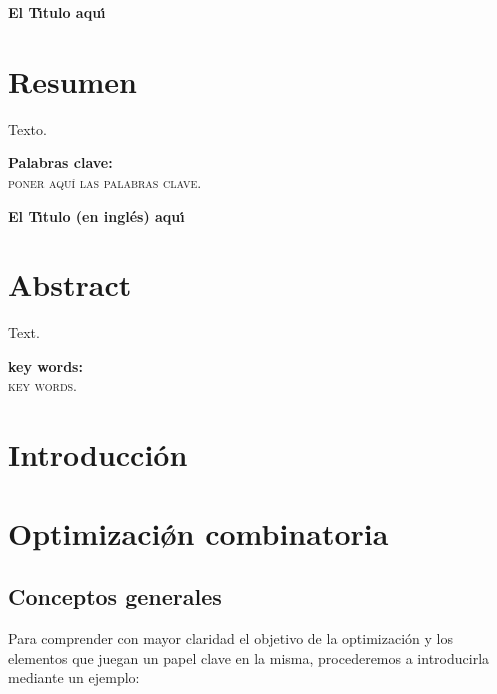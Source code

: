 \documentclass[a4paper, 12pt, oneside]{book}
\begin{document}
	
	
	
	
	
	
	
	
	
	
	\tableofcontents
	
	
	\pagebreak
	
	{\let\clearpage\relax
		
		{\Large \textbf{El T\'{\i}tulo aqu\'{\i}}}\\
		
		\chapter*{Resumen}
	}
	Texto.
	
	\vfill
	
	\textbf{Palabras clave:}\\
	
	\textsc{poner aqu\'{\i} las palabras clave.}
	
	\pagebreak
	
	{\let\clearpage\relax
		
		{\Large \textbf{El T\'{\i}tulo (en ingl\'{e}s) aqu\'{\i}}}\\
		
		\chapter*{Abstract}
	}
	
	Text. 
	
	\vfill
	
	\textbf{key words:}\\
	
	\textsc{key words.}
	
	\chapter*{Introducci\'on}
	
	
	\chapter{Optimizaci\'{\o}n combinatoria}
	\setcounter{page}{1}
	
	\section{Conceptos generales}
	Para comprender con mayor claridad el objetivo de la optimizaci\'{o}n y los elementos que juegan un papel clave en la misma, procederemos a introducirla mediante un ejemplo:
	\\
	
\end{document}
